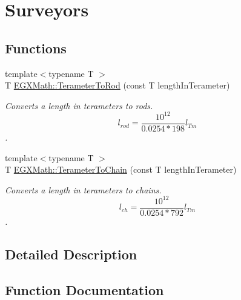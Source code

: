 \hypertarget{group___e_g_x_math-_conversions-_length_conversions-_s_i-_terameter-_surveyors}{}\section{Surveyors}
\label{group___e_g_x_math-_conversions-_length_conversions-_s_i-_terameter-_surveyors}
\subsection*{Functions}
\begin{DoxyCompactItemize}
\item 
{\footnotesize template$<$typename T $>$ }\\T \mbox{\hyperlink{group___e_g_x_math-_conversions-_length_conversions-_s_i-_terameter-_surveyors_gaa3d08b1f4809bc73a7194ab85c849737}{E\+G\+X\+Math\+::\+Terameter\+To\+Rod}} (const T length\+In\+Terameter)
\begin{DoxyCompactList}\small\item\em Converts a length in terameters to rods. \[ l_{rod}= \frac{10^{12}}{0.0254 * 198} l_{Tm} \]. \end{DoxyCompactList}\item 
{\footnotesize template$<$typename T $>$ }\\T \mbox{\hyperlink{group___e_g_x_math-_conversions-_length_conversions-_s_i-_terameter-_surveyors_gad6ead4722ba7575e34a276dadfdb928b}{E\+G\+X\+Math\+::\+Terameter\+To\+Chain}} (const T length\+In\+Terameter)
\begin{DoxyCompactList}\small\item\em Converts a length in terameters to chains. \[ l_{ch}= \frac{10^{12}}{0.0254 * 792} l_{Tm} \]. \end{DoxyCompactList}\end{DoxyCompactItemize}


\subsection{Detailed Description}


\subsection{Function Documentation}
\mbox{\label{group___e_g_x_math-_conversions-_length_conversions-_s_i-_terameter-_surveyors_gad6ead4722ba7575e34a276dadfdb928b}} 
